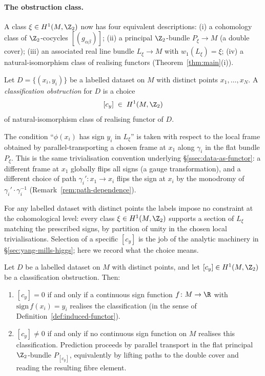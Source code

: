 \paragraph{The obstruction class.} A class
$\xi\in H^1(M,\Z_2)$ now has four equivalent descriptions:
(i) a cohomology class of $\Z_2$-cocycles $[(g_{\alpha\beta})]$;
(ii) a principal $\Z_2$-bundle $P_\xi\to M$ (a double cover);
(iii) an associated real line bundle $L_\xi\to M$ with
$w_1(L_\xi)=\xi$;
(iv) a natural-isomorphism class of realising functors
(Theorem~\ref{thm:main}(i)).

\begin{definition}\label{def:cy}
Let $D=\{(x_i,y_i)\}$ be a labelled dataset on $M$ with distinct
points $x_1,\dots,x_N$. A \emph{classification obstruction} for $D$
is a choice
\[
   [c_y] \;\in\; H^1(M,\Z_2)
\]
of natural-isomorphism class of realising functor of $D$.
\end{definition}

The condition ``$\phi(x_i)$ has sign $y_i$ in $L_\xi$'' is taken with
respect to the local frame obtained by parallel-transporting a chosen
frame at $x_1$ along $\gamma_i$ in the flat bundle $P_\xi$. This is
the same trivialisation convention underlying \S\ref{ssec:data-as-functor}:
a different frame at $x_1$ globally flips all signs (a gauge
transformation), and a different choice of path
$\gamma_i'\colon x_1\to x_i$ flips the sign at $x_i$ by the monodromy
of $\gamma_i'\cdot\gamma_i^{-1}$ (Remark~\ref{rem:path-dependence}).

For any labelled dataset with distinct points the labels impose no
constraint at the cohomological level: every class
$\xi\in H^1(M,\Z_2)$ supports a section of $L_\xi$ matching the
prescribed signs, by partition of unity in the chosen local
trivialisations. Selection of a specific $[c_y]$ is the job of the
analytic machinery in \S\ref{sec:yang-mills-higgs}; here we record
what the choice means.

\begin{corollary}\label{cor:obstruction}
Let $D$ be a labelled dataset on $M$ with distinct points, and let
$[c_y]\in H^1(M,\Z_2)$ be a classification obstruction. Then:
\begin{enumerate}[label=(\roman*),leftmargin=2em]
  \item $[c_y]=0$ if and only if a continuous sign function
  $f\colon M\to\R$ with $\mathrm{sign}\,f(x_i)=y_i$ realises the
  classification (in the sense of
  Definition~\ref{def:induced-functor}).
  \item $[c_y]\neq 0$ if and only if no continuous sign function on
  $M$ realises this classification. Prediction proceeds by parallel
  transport in the flat principal $\Z_2$-bundle $P_{[c_y]}$,
  equivalently by lifting paths to the double cover and reading the
  resulting fibre element.
\end{enumerate}
\end{corollary}

